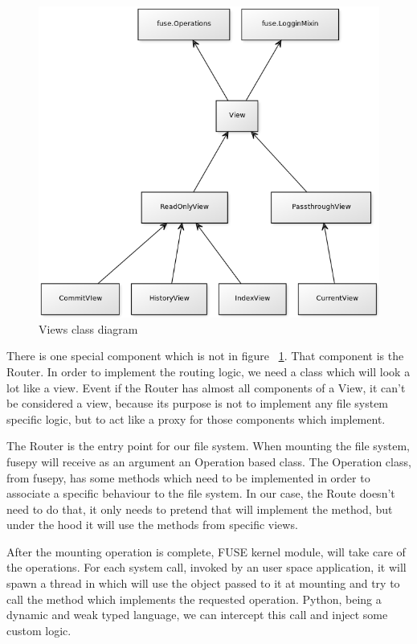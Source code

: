 \begin{figure}[h]
  \begin{center}
    \includegraphics[width=15cm]{concurrency/views-gitfs.png}
  \end{center}
  \caption{Views class diagram}
  \label{fig:views_diagram}
\end{figure}

There is one special component which is not in figure ~\ref{fig:views_diagram}. That component is the Router. In order to implement the routing logic, we need a class which will look a lot like a view. Event if the Router has almost all components of a View, it can't be considered a view, because its purpose is not to implement any file system specific logic, but to act like a proxy for those components which implement.

The Router is the entry point for our file system. When mounting the file system, fusepy will receive as an argument an Operation based class. The Operation class, from fusepy, has some methods which need to be implemented in order to associate a specific behaviour to the file system. In our case, the Route doesn't need to do that, it only needs to pretend that will implement the method, but under the hood it will use the methods from specific views.

After the mounting operation is complete, FUSE kernel module, will take care of the operations. For each system call, invoked by an user space application, it will spawn a thread in which will use the object passed to it at mounting and try to call the method which implements the requested operation. Python, being a dynamic and weak typed language, we can intercept this call and inject some custom logic. 

